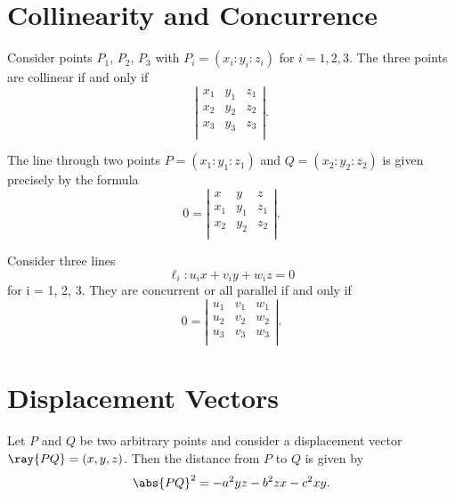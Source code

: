 \documentclass[11pt]{scrartcl}
\begin{document}
\pagebreak
\section{Collinearity and Concurrence}
\begin{theorem}
  [Collinearity]
  Consider points $P_1$, $P_2$, $P_3$ with $P_i = (x_i : y_i : z_i)$ for $i = 1, 2, 3$. The three points are collinear if and only if
  \[
    \left\lvert
    \begin{array}{ccc}
      x_1 & y_1 & z_1 \\
      x_2 & y_2 & z_2 \\
      x_3 & y_3 & z_3 \\
    \end{array}
    \right\rvert.
  \]
\end{theorem}

\begin{proposition}
  The line through two points $P = (x_1 : y_1 : z_1)$ and $Q = (x_2 : y_2 : z_2)$ is given precisely by the formula
    \[0 =
    \left\lvert
    \begin{array}{ccc}
      x & y & z \\
      x_1 & y_1 & z_1 \\
      x_2 & y_2 & z_2 \\
    \end{array}
    \right\rvert.
  \]
\end{proposition}

\begin{theorem}
  [Concurrence]
  Consider three lines
  \[\ell_i : u_ix + v_iy + w_iz = 0\]
  for i = 1, 2, 3. They are concurrent or all parallel if and only if
    \[0=
    \left\lvert
    \begin{array}{ccc}
      u_1 & v_1 & w_1 \\
      u_2 & v_2 & w_2 \\
      u_3 & v_3 & w_3 \\
    \end{array}
    \right\rvert.
  \]
\end{theorem}

\section{Displacement Vectors}
\begin{theorem}
  Let $P$ and $Q$ be two arbitrary points and consider a displacement vector $\ray{PQ} = (x, y, z)$. Then the distance from $P$ to $Q$ is given by
  \[\abs{PQ}^2=-a^2yz-b^2zx-c^2xy.\]
\end{theorem}
\end{document}
